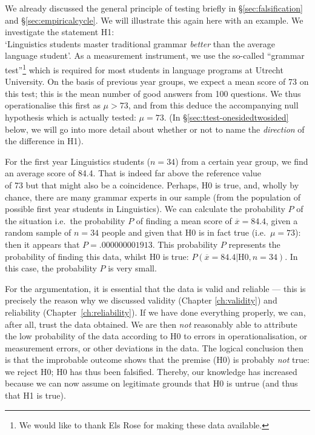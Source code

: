\documentclass[
]{book}
\begin{document}
We already discussed the general principle of testing briefly in
§\ref{sec:falsification} and §\ref{sec:empiricalcycle}.
We will illustrate this again here
with an example. We investigate the statement H1:\\
`Linguistics students master traditional
grammar \emph{better} than the average language student'. As a measurement instrument,
we use the so-called ``grammar test''\footnote{We would like to thank Els Rose for making these data available.} which is required for most students
in language programs at Utrecht University. On the basis of previous year groups,
we expect a mean score of 73 on this test; this is the mean number of good answers
from 100 questions. We thus operationalise this first as \(\mu > 73\), and from this deduce
the accompanying null hypothesis which is actually tested:
\(\mu = 73\).
(In §\ref{sec:ttest-onesidedtwosided} below, we will go into more detail
about whether or not to name the \emph{direction} of the difference in H1).

For the first year Linguistics students (\(n=34\)) from a certain year group,
we find an average score of 84.4. That is indeed far above the reference value\\
of 73 but that might also be a coincidence.
Perhaps, H0 is true, and, wholly by chance, there are many grammar experts
in our sample (from the population of possible first year students
in Linguistics). We can calculate the probability \(P\) of the situation
i.e.~the probability \(P\) of finding a mean score of \(\overline{x}=84.4\),
given a random sample of \(n=34\) people and given that
H0 is in fact true (i.e.~\(\mu=73\)): then it appears that
\(P=.000000001913\). This probability \(P\) represents the probability of finding this
data, whilst H0 is true:
\(P(\overline{x}=84.4|\textrm{H0},n=34)\). In this case, the probability \(P\)
is very small.

For the argumentation, it is essential that the data is valid and
reliable --- this is precisely the reason why we discussed validity
(Chapter \ref{ch:validity}) and reliability
(Chapter~\ref{ch:reliability}). If we have done everything properly,
we can, after all, trust the data obtained.
We are then \emph{not} reasonably able to attribute the low probability of the data according
to H0 to errors in operationalisation, or measurement errors, or other deviations in the data.
The logical conclusion then is that the improbable outcome shows that the
premise (H0) is probably \emph{not} true: we reject H0; H0 has thus been
falsified. Thereby, our knowledge has increased because we can now
assume on legitimate grounds that H0 is untrue (and thus that H1
is true).
\end{document}
